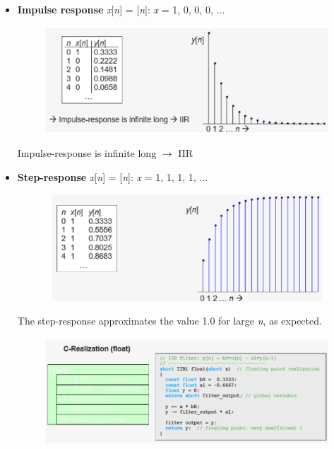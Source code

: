 \begin{itemize}
\item \textbf{Impulse response}  \textit{x}[\textit{n}] = [\textit{n}]:   \textit{x} = { 1, 0, 0, 0, ...}
    \begin{figure}[h]
    \centering
    \includegraphics[width=12cm, height=4cm]{Images/image144.png}
    \label{fig:Fig }
    \end{figure}

Impulse-response is infinite long \hspace{1cm} $\rightarrow$ IIR

\item \textbf{Step-response} \textit{x}[\textit{n}] = [\textit{n}]:   \textit{x} = {1, 1, 1, 1, ...}
	\begin{figure}[h]
    \centering
    \includegraphics[width=12cm, height=4cm]{Images/image145.png}
    \label{fig:Fig }
    \end{figure}

The step-response approximates the value 1.0 for large \textit{n}, as expected.

	\begin{figure}[h]
    \centering
    \includegraphics[width=14cm, height=4cm]{Images/image146.png}
    \label{fig:Fig }
    \end{figure}
\end{itemize}

